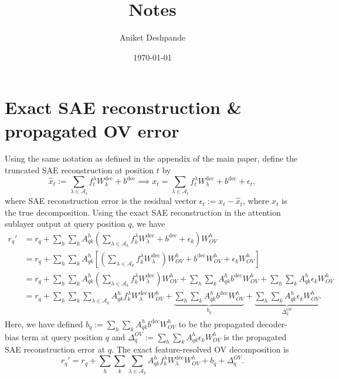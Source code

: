 \documentclass[10pt]{article}
\title{\vspace{-2em} Notes}
\author{Aniket Deshpande}
\date{\today}
\theoremstyle{definition}
\newcommand{\R}{\mathbb{R}}
\newcommand{\1}{\mathbf{1}}
\newcommand{\dec}{\mathrm{dec}}
\begin{document}
\maketitle
\vspace{-2em}



\section{Exact SAE reconstruction \& propagated OV error}

Using the same notation as defined in the appendix of the main paper, define the truncated SAE reconstruction at position $t$ by
\begin{equation}
    \hat{x}_t := \sum_{\lambda \in \mathcal A_t}f_t^\lambda W_\lambda^\dec + b^\dec \implies x_t = \sum_{\lambda \in \mathcal A_t}f_t^\lambda W_\lambda^\dec + b^\dec + \epsilon_t,
\end{equation}
where SAE reconstruction error is the residual vector $\epsilon_t := x_t - \hat{x}_t$, where $x_t$ is the true decomposition. Using the exact SAE reconstruction in the attention sublayer output at query position $q$, we have
\begin{align}
    r_q' &= r_q + \sum_h\sum_k A_{qk}^h \left(\sum_{\lambda \in \mathcal A_k}f_k^\lambda W_\lambda^\dec + b^\dec + \epsilon_k\right) W_{OV}^h \\
    &= r_q + \sum_h\sum_k A_{qk}^h \left[ \left(\sum_{\lambda \in \mathcal A_k}f_k^\lambda W_\lambda^\dec\right)W_{OV}^h + b^\dec W_{OV}^h + \epsilon_k W_{OV}^h \right] \\
    &= r_q + \sum_h\sum_k A_{qk}^h \left(\sum_{\lambda \in \mathcal A_k}f_k^\lambda W_\lambda^\dec\right)W_{OV}^h + \sum_h\sum_k A_{qk}^h b^\dec W_{OV}^h + \sum_h\sum_k A_{qk}^h \epsilon_k W_{OV}^h  \\
    &= r_q + \sum_h\sum_k \sum_{\lambda \in \mathcal A_k}A_{qk}^h f_k^\lambda W_\lambda^\dec W_{OV}^h + \underbrace{ \sum_h\sum_k A_{qk}^h b^\dec W_{OV}^h}_{b_q} + \underbrace{\sum_h\sum_k A_{qk}^h \epsilon_k W_{OV}^h}_{\Delta_q^{OV}}.
\end{align}
Here, we have defined $b_q :=\sum_h\sum_k A_{qk}^h b^\dec W_{OV}^h$ to be the propagated decoder-bias term at query position $q$ and $\Delta_q^{OV} := \sum_h\sum_k A_{qk}^h \epsilon_k W_{OV}^h$ is the propagated SAE reconstruction error at $q$. The exact feature-resolved OV decomposition is
\begin{equation}
    r_q' = r_q + \sum_h\sum_k \sum_{\lambda \in \mathcal A_k}A_{qk}^h f_k^\lambda W_\lambda^\dec W_{OV}^h + b_q + \Delta_q^{OV}.
\end{equation}
\end{document}

